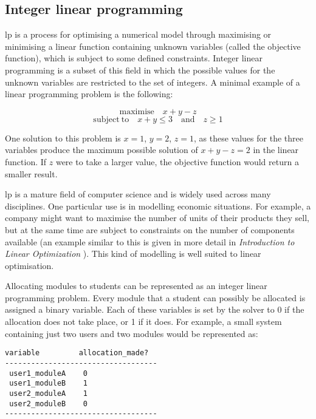 
\subsection{Integer linear programming}
\label{sec:researchilp}

\Gls{lp} is a process for optimising a numerical model through maximising or
minimising a linear function containing unknown variables (called the
objective function), which is subject to some defined constraints. Integer
linear programming is a subset of this field in which the possible values for
the unknown variables are restricted to the set of integers. A minimal example
of a linear programming problem is the following:

$$ \mathrm{maximise} \quad x + y - z $$
$$ \mathrm{subject~to} \quad x + y \leq 3 \quad \mathrm{and} \quad z \geq 1 $$

One solution to this problem is $x=1$, $y=2$, $z=1$, as these values for the
three variables produce the maximum possible solution of $x+y-z=2$ in the
linear function. If $z$ were to take a larger value, the objective function
would return a smaller result.

\Gls{lp} is a mature field of computer science and is widely used across many
disciplines. One particular use is in modelling economic situations. For
example, a company might want to maximise the number of units of their
products they sell, but at the same time are subject to constraints on the
number of components available (an example similar to this is given in more
detail in \emph{Introduction to Linear Optimization} \cite{IntroLP_1997}).
This kind of modelling is well suited to linear optimisation.

Allocating modules to students can be represented as an integer linear
programming problem. Every module that a student can possibly be allocated is
assigned a binary variable. Each of these variables is set by the solver to 0
if the allocation does not take place, or 1 if it does. For example, a small
system containing just two users and two modules would be represented
as:\mynobreakpar

\begin{Verbatim}[samepage=true]
 variable         allocation_made?
-----------------------------------
 user1_moduleA    0
 user1_moduleB    1
 user2_moduleA    1
 user2_moduleB    0
-----------------------------------
\end{Verbatim}

